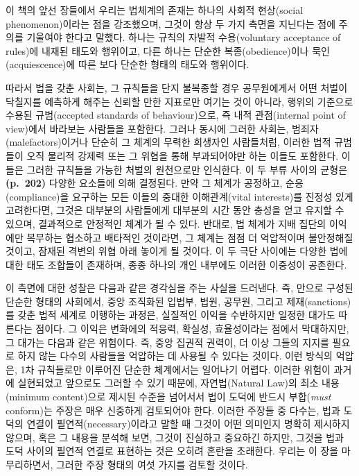 이 책의 앞선 장들에서 우리는 법체계의 존재는 하나의 사회적 현상(social
phenomenon)이라는 점을 강조했으며, 그것이 항상 두 가지 측면을 지닌다는
점에 주의를 기울여야 한다고 말했다. 하나는 규칙의 자발적 수용(voluntary
acceptance of rules)에 내재된 태도와 행위이고, 다른 하나는 단순한
복종(obedience)이나 묵인(acquiescence)에 따른 보다 단순한 형태의 태도와
행위이다.

따라서 법을 갖춘 사회는, 그 규칙들을 단지 불복종할 경우 공무원에게서
어떤 처벌이 닥칠지를 예측하게 해주는 신뢰할 만한 지표로만 여기는 것이
아니라, 행위의 기준으로 수용된 규범(accepted standards of
behaviour)으로, 즉 내적 관점(internal point of view)에서 바라보는
사람들을 포함한다. 그러나 동시에 그러한 사회는,
범죄자(malefactors)이거나 단순히 그 체계의 무력한 희생자인 사람들처럼,
이러한 법적 규범들이 오직 물리적 강제력 또는 그 위협을 통해 부과되어야만
하는 이들도 포함한다. 이들은 그러한 규칙들을 가능한 처벌의 원천으로만
인식한다. 이 두 부류 사이의 균형은 \textbf{(p.~202)} 다양한 요소들에
의해 결정된다. 만약 그 체계가 공정하고, 순응(compliance)을 요구하는 모든
이들의 중대한 이해관계(vital interests)를 진정성 있게 고려한다면, 그것은
대부분의 사람들에게 대부분의 시간 동안 충성을 얻고 유지할 수 있으며,
결과적으로 안정적인 체계가 될 수 있다. 반대로, 법 체계가 지배 집단의
이익에만 복무하는 협소하고 배타적인 것이라면, 그 체계는 점점 더
억압적이며 불안정해질 것이고, 잠재된 격변의 위협 아래 놓이게 될 것이다.
이 두 극단 사이에는 다양한 법에 대한 태도 조합들이 존재하며, 종종 하나의
개인 내부에도 이러한 이중성이 공존한다.

이 측면에 대한 성찰은 다음과 같은 경각심을 주는 사실을 드러낸다. 즉,
만으로 구성된 단순한 형태의
사회에서, 중앙 조직화된 입법부, 법원, 공무원, 그리고 제재(sanctions)를
갖춘 법적 세계로 이행하는 과정은, 실질적인 이익을 수반하지만 일정한
대가도 따른다는 점이다. 그 이익은 변화에의 적응력, 확실성, 효율성이라는
점에서 막대하지만, 그 대가는 다음과 같은 위험이다. 즉, 중앙 집권적
권력이, 더 이상 그들의 지지를 필요로 하지 않는 다수의 사람들을 억압하는
데 사용될 수 있다는 것이다. 이런 방식의 억압은, 1차 규칙들로만 이루어진
단순한 체계에서는 일어나기 어렵다. 이러한 위험이 과거에 실현되었고
앞으로도 그러할 수 있기 때문에, 자연법(Natural Law)의 최소 내용(minimum
content)으로 제시된 수준을 넘어서서 법이 도덕에 반드시 부합(\emph{must} conform)는 주장은 매우 신중하게 검토되어야 한다.
이러한 주장들 중 다수는, 법과 도덕의 연결이 필연적(necessary)이라고 말할
때 그것이 어떤 의미인지 명확히 제시하지 않으며, 혹은 그 내용을 분석해
보면, 그것이 진실하고 중요하긴 하지만, 그것을 법과 도덕 사이의 필연적
연결로 표현하는 것은 오히려 혼란을 초래한다. 우리는 이 장을
마무리하면서, 그러한 주장 형태의 여섯 가지를 검토할 것이다.

